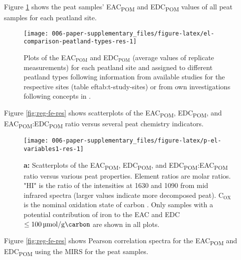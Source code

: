 \documentclass[draft,linenumbers]{agujournal2018}
\begin{document}
\clearpage

Figure \ref{fig:el-comparison-peatland-types-res} shows the peat
samples' EAC\textsubscript{POM} and EDC\textsubscript{POM} values of all
peat samples for each peatland site.

\begin{figure}[H]

{\centering \texttt{[image: 006-paper-supplementary\_files/figure-latex/el-comparison-peatland-types-res-1]} 

}

\caption{Plots of the EAC$_\text{POM}$ and EDC$_\text{POM}$ (average values of replicate measurements) for each peatland site and assigned to different peatland types following information from available studies for the respective sites (table ef{tab:t-study-sites}) or from own investigations following concepts in \citet{Rydin.2013}.}\label{fig:el-comparison-peatland-types-res}
\end{figure}

\clearpage

Figure \ref{fig:reg-fe-res} shows scatterplots of the
EAC\textsubscript{POM}, EDC\textsubscript{POM}, and
EAC\textsubscript{POM}:EDC\textsubscript{POM} ratio versus several peat
chemistry indicators.

\begin{figure}[H]

{\centering \texttt{[image: 006-paper-supplementary\_files/figure-latex/p-el-variables1-res-1]} 

}

\caption{\textbf{a:} Scatterplots of the EAC\textsubscript{POM}, EDC\textsubscript{POM}, and EDC\textsubscript{POM}:EAC\textsubscript{POM} ratio versus various peat properties. Element ratios are molar ratios. "HI" is the ratio of the intensities at 1630 and \SI{1090}{\wn} from mid infrared spectra (larger values indicate more decomposed peat). C$_\text{OX}$ is the nominal oxidation state of carbon \citep{Masiello.2008}. Only samples with a potential contribution of iron to the EAC and EDC $\le\SI{100}{\micro\mol\per\gram\carbon}$ are shown in all plots.}\label{fig:p-el-variables1-res}
\end{figure}

\clearpage

Figure \ref{fig:reg-fe-res} shows Pearson correlation spectra for the
EAC\textsubscript{POM} and EDC\textsubscript{POM} using the MIRS for the
peat samples.
\end{document}
